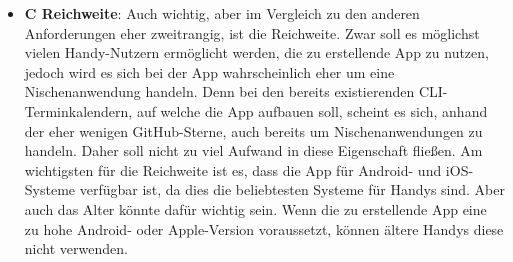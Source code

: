 \begin{itemize}
	\item \textbf{C Reichweite}: %
		Auch wichtig, aber im Vergleich zu den anderen Anforderungen eher zweitrangig, ist die Reichweite. %
			Zwar soll es möglichst vielen Handy-Nutzern ermöglicht werden, die zu erstellende App zu nutzen, jedoch wird es sich bei der App wahrscheinlich eher um eine Nischenanwendung handeln. Denn bei den bereits existierenden CLI-Terminkalendern, auf welche die App aufbauen soll, scheint es sich, anhand der eher wenigen GitHub-Sterne, auch bereits um Nischenanwendungen zu handeln\cite{cli_calcurseGitHub, cli_khal}. %
			Daher soll nicht zu viel Aufwand in diese Eigenschaft fließen.\newline%
		Am wichtigsten für die Reichweite ist es, dass die App für Android- und iOS-Systeme verfügbar ist, da dies die beliebtesten Systeme für Handys sind\cite{pcVsphone_mobileOperatingSystem}. %
		Aber auch das Alter könnte dafür wichtig sein. Wenn die zu erstellende App eine zu hohe Android- oder Apple-Version voraussetzt, können ältere Handys diese nicht verwenden.%
%
%
%

\end{itemize}